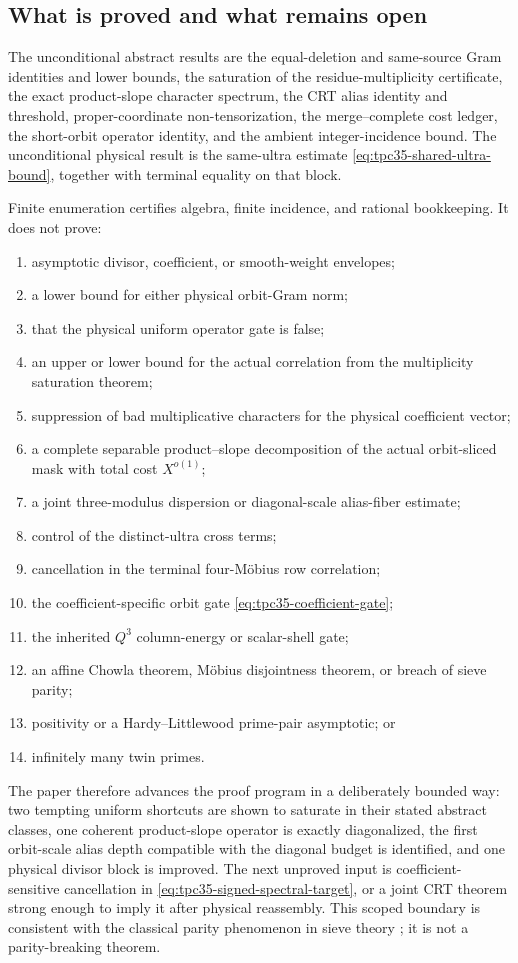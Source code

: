 \subsection{What is proved and what remains open}

The unconditional abstract results are the equal-deletion and
same-source Gram identities and lower bounds, the saturation of the
residue-multiplicity certificate, the exact product-slope character
spectrum, the CRT alias identity and threshold, proper-coordinate
non-tensorization, the merge--complete cost ledger, the short-orbit
operator identity, and the ambient integer-incidence bound.  The
unconditional physical result is the same-ultra estimate
\eqref{eq:tpc35-shared-ultra-bound}, together with terminal equality on
that block.

Finite enumeration certifies algebra, finite incidence, and rational
bookkeeping.  It does not prove:
\begin{enumerate}[label=\textup{(\roman*)}]
 \item asymptotic divisor, coefficient, or smooth-weight envelopes;
 \item a lower bound for either physical orbit-Gram norm;
 \item that the physical uniform operator gate is false;
 \item an upper or lower bound for the actual correlation from the
 multiplicity saturation theorem;
 \item suppression of bad multiplicative characters for the physical
 coefficient vector;
 \item a complete separable product--slope decomposition of the actual
 orbit-sliced mask with total cost \(X^{o(1)}\);
 \item a joint three-modulus dispersion or diagonal-scale alias-fiber
 estimate;
 \item control of the distinct-ultra cross terms;
 \item cancellation in the terminal four-M\"obius row correlation;
 \item the coefficient-specific orbit gate
 \eqref{eq:tpc35-coefficient-gate};
 \item the inherited \(Q^3\) column-energy or scalar-shell gate;
 \item an affine Chowla theorem, M\"obius disjointness theorem, or breach
 of sieve parity;
 \item positivity or a Hardy--Littlewood prime-pair asymptotic; or
 \item infinitely many twin primes.
\end{enumerate}

The paper therefore advances the proof program in a deliberately bounded
way: two tempting uniform shortcuts are shown to saturate in their stated
abstract classes, one coherent product-slope operator is exactly
diagonalized, the first orbit-scale alias depth compatible with the
diagonal budget is identified, and
one physical divisor block is improved.  The next unproved input is
coefficient-sensitive cancellation in
\eqref{eq:tpc35-signed-spectral-target}, or a joint CRT theorem strong
enough to imply it after physical reassembly.  This scoped boundary is
consistent with the classical parity phenomenon in sieve theory
\citep{HeathBrown1982Parity}; it is not a parity-breaking theorem.
